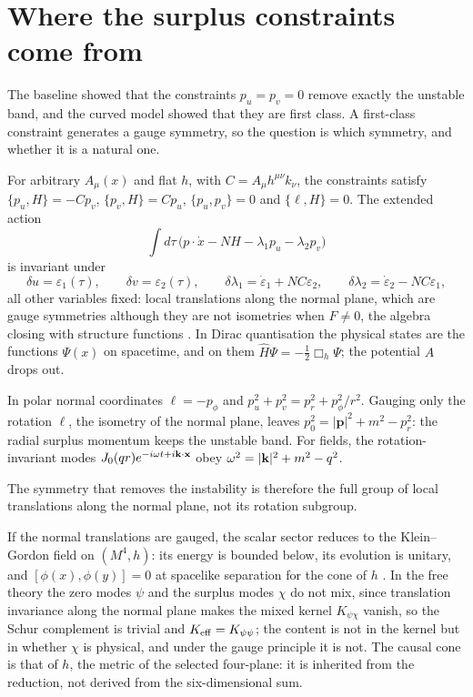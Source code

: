 \section{Where the surplus constraints come from}
\label{sec:constraints}

The baseline showed that the constraints $p_u=p_v=0$ remove exactly the unstable band, and the curved model showed that they are first class. A first-class constraint
generates a gauge symmetry, so the question is which symmetry, and whether it is a natural one.

\begin{theorem}
\label{thm:wlgauge}
For arbitrary $A_\mu(x)$ and flat $h$, with $C=A_\mu h^{\mu\nu}k_\nu$, the constraints satisfy $\{p_u,H\}=-Cp_v$, $\{p_v,H\}=Cp_u$, $\{p_u,p_v\}=0$ and $\{\ell,H\}=0$. The extended action
\[
\int d\tau\,\bigl(p\cdot\dot x-NH-\lambda_1p_u-\lambda_2p_v\bigr)
\]
is invariant under
\[
\delta u=\varepsilon_1(\tau),\qquad \delta v=\varepsilon_2(\tau),\qquad \delta\lambda_1=\dot\varepsilon_1+NC\varepsilon_2,\qquad \delta\lambda_2=\dot\varepsilon_2-NC\varepsilon_1,
\]
all other variables fixed: local translations along the normal plane, which are gauge symmetries although they are not isometries when $F\neq0$, the algebra closing with
structure functions \cite{HenneauxTeitelboim92}. In Dirac quantisation the physical states are the functions $\Psi(x)$ on spacetime, and on them $\hat H\Psi=-\tfrac12\Box_h\Psi$;
the potential $A$ drops out.
\end{theorem}

\begin{proposition}
\label{prop:isometryonly}
In polar normal coordinates $\ell=-p_\phi$ and $p_u^2+p_v^2=p_r^2+p_\phi^2/r^2$. Gauging only the rotation $\ell$, the isometry of the normal plane, leaves
$p_0^2=|\mathbf p|^2+m^2-p_r^2$: the radial surplus momentum keeps the unstable band. For fields, the rotation-invariant modes $J_0(qr)e^{-i\omega t+i\mathbf k\cdot\mathbf x}$ obey
$\omega^2=|\mathbf k|^2+m^2-q^2$.
\end{proposition}

The symmetry that removes the instability is therefore the full group of local translations along the normal plane, not its rotation subgroup.

\begin{corollary}
\label{cor:weak}
If the normal translations are gauged, the scalar sector reduces to the Klein--Gordon field on $(M^4,h)$: its energy is bounded below, its evolution is unitary, and
$[\phi(x),\phi(y)]=0$ at spacelike separation for the cone of $h$ \cite{WeinbergQFT}. In the free theory the zero modes $\psi$ and the surplus modes $\chi$ do not mix, since
translation invariance along the normal plane makes the mixed kernel $K_{\psi\chi}$ vanish, so the Schur complement is trivial and $K_{\rm eff}=K_{\psi\psi}$; the content is not in
the kernel but in whether $\chi$ is physical, and under the gauge principle it is not. The causal cone is that of $h$, the metric of the selected four-plane: it is inherited
from the reduction, not derived from the six-dimensional sum.
\end{corollary}

